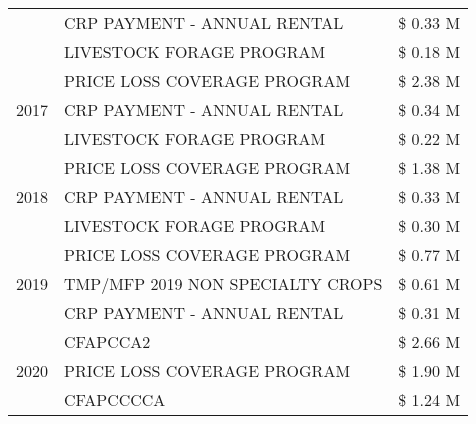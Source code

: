 \begin{tabular}{llr}
 & CRP PAYMENT - ANNUAL RENTAL & \$ 0.33 M \\
 & LIVESTOCK FORAGE PROGRAM & \$ 0.18 M \\
\cline{1-3}
\multirow[t]{3}{*}{2017} & PRICE LOSS COVERAGE PROGRAM & \$ 2.38 M \\
 & CRP PAYMENT - ANNUAL RENTAL & \$ 0.34 M \\
 & LIVESTOCK FORAGE PROGRAM & \$ 0.22 M \\
\cline{1-3}
\multirow[t]{3}{*}{2018} & PRICE LOSS COVERAGE PROGRAM & \$ 1.38 M \\
 & CRP PAYMENT - ANNUAL RENTAL & \$ 0.33 M \\
 & LIVESTOCK FORAGE PROGRAM & \$ 0.30 M \\
\cline{1-3}
\multirow[t]{3}{*}{2019} & PRICE LOSS COVERAGE PROGRAM & \$ 0.77 M \\
 & TMP/MFP 2019 NON SPECIALTY CROPS & \$ 0.61 M \\
 & CRP PAYMENT - ANNUAL RENTAL & \$ 0.31 M \\
\cline{1-3}
\multirow[t]{3}{*}{2020} & CFAPCCA2 & \$ 2.66 M \\
 & PRICE LOSS COVERAGE PROGRAM & \$ 1.90 M \\
 & CFAPCCCCA & \$ 1.24 M \\
\cline{1-3}
\bottomrule
\end{tabular}
